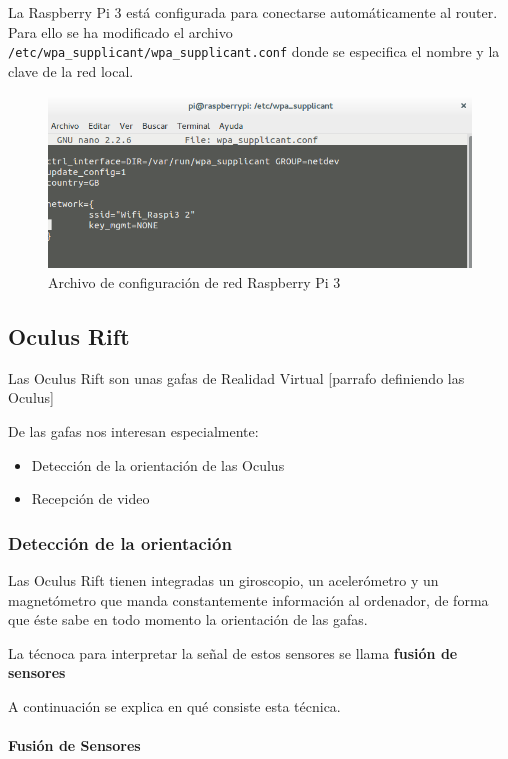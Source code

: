\documentclass[twoside, 12pt]{epstfg}
\begin{document}
La Raspberry Pi 3 está configurada para conectarse automáticamente al router. Para ello se ha modificado el archivo \texttt{/etc/wpa\_supplicant/wpa\_supplicant.conf} donde se especifica el nombre y la clave de la red local.

\begin{figure}[h]
	\centerline{
		\mbox{\includegraphics[width=.95\textwidth]{images/confRaspiWifi.png}}
	}
	\caption{Archivo de configuración de red Raspberry Pi 3}
\end{figure}
 

\subsection{Oculus Rift}

Las Oculus Rift son unas gafas de Realidad Virtual [parrafo definiendo las Oculus]

De las gafas nos interesan especialmente:
\begin{itemize}
	\item Detección de la orientación de las Oculus
	\item Recepción de video
\end{itemize}

\subsubsection{Detección de la orientación}



Las Oculus Rift tienen integradas un giroscopio, un acelerómetro y un magnetómetro que manda constantemente información al ordenador, de forma que éste sabe en todo momento la orientación de las gafas.

La técnoca para interpretar la señal de estos sensores se llama \textbf{fusión de sensores}

A continuación se explica en qué consiste esta técnica.

\paragraph{Fusión de Sensores }
\end{document}
